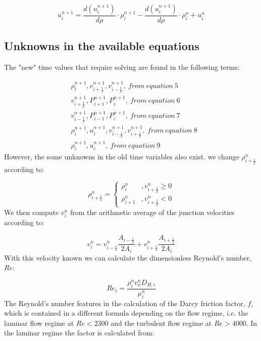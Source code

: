 \documentclass[11pt,letterpaper,titlepage]{article}
\newcommand{\half}{\frac{1}{2}}
\begin{document}
\begin{equation}
u_{i}^{n+1} = \frac{d(u_i^{n+1})}{d\rho}\cdot \rho_{i}^{n+1} -\frac{d(u_i^{n+1})}{d\rho}\cdot\rho_{i}^{n} +  u_{i}^{n}   
\end{equation}






\newpage
\subsection{Unknowns in the available equations}
The "new" time values that require solving are found in the following terms:

\begin{equation*}
\begin{aligned}
&\rho_i^{n+1}, v_{i+\half}^{n+1}, v_{i-\half}^{n+1}, \ from \ equation \ 5 \\
&v_{i+\half}^{n+1}, P_{i+1}^{n+1},P_{i}^{n+1}, \ from \ equation \ 6 \\
&v_{i-\half}^{n+1}, P_{i-1}^{n+1},P_{i}^{n+1}, \ from \ equation \ 7 \\
&\rho_i^{n+1}, u_{i}^{n+1}, v_{i-\half}^{n+1},v_{i+\half}^{n+1}, \ from \ equation \ 8 \\
&\rho_i^{n+1}, u_{i}^{n+1}, \ from \ equation \ 9
\end{aligned}
\end{equation*}
\newline
However, the some unknowns in the old time variables also exist. we change $\rho_{i+\half}^{n}$ according to:

\begin{equation*}
\rho_{i+\half}^{n}=
\begin{cases}
\rho_{i}^{n}       &, v_{i+\half}^n\ge 0 \\
\rho_{i+1}^{n}     &, v_{i+\half}^n<0
\end{cases}
\end{equation*}
\newline
We then compute $v_i^{n}$ from the arithmetic average of the junction velocities according to:

\begin{equation*}
v_i^{n}=v_{i-\half}^n \frac{A_{i-\half}}{2A_i} + v_{i+\half}^n \frac{A_{i+\half}}{2A_i}
\end{equation*}
\newline
With this velocity known we can calculate the dimensionless Reynold's number, $Re$:

\begin{equation*}
Re_i=\frac{\rho_i^n v_n^n D_{H,i}}{\mu_i^n}
\end{equation*}
\newline
The Reynold's number features in the calculation of the Darcy friction factor, $f$, which is contained in a different formula depending on the flow regime, i.e. the laminar flow regime at $Re<2300$ and the turbulent flow regime at $Re>4000$. In the laminar regime the factor is calculated from:
\end{document}
